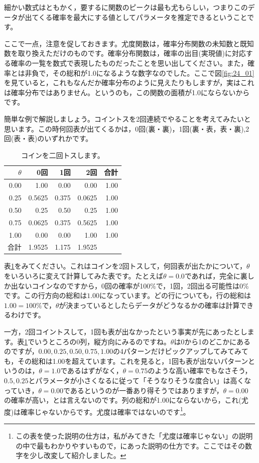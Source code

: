 \documentclass{ltjsbook}
\begin{document}
細かい数式はともかく，要するに関数のピークは最も尤もらしい，つまりこのデータが出てくる確率を最大にする値としてパラメータを推定できるということです。

ここで一点，注意を促しておきます。尤度関数は，確率分布関数の未知数と既知数を取り換えただけのものです。確率分布関数は，確率の出目(実現値)に対応する確率の一覧を数式で表現したものだったことを思い出してください。また，確率とは非負で，その総和が1.0になるような数字なのでした。ここで図\ref{fig:24_01}を見ていると，これもなんだか確率分布のように見えたりもしますが，実はこれは確率分布ではありません。というのも，この関数の面積が1.0にならないからです。

簡単な例で解説しましょう。コイントスを2回連続でやることを考えてみたいと思います。この時何回表が出てくるかは，0回(裏・裏)，1回(裏・表，表・裏),2回(表・表)のいずれかです。

\begin{table}[ht]
	\centering
	\caption{コインを二回トスします。}
	\begin{tabular}{rrrrr}
		\hline
		$\theta$ & 0回     & 1回    & 2回     & 合計   \\
		\hline
		0.00     & 1.00   & 0.00  & 0.00   & 1.00 \\
		0.25     & 0.5625 & 0.375 & 0.0625 & 1.00 \\
		0.50     & 0.25   & 0.50  & 0.25   & 1.00 \\
		0.75     & 0.0625 & 0.375 & 0.5625 & 1.00 \\
		1.00     & 0.00   & 0.00  & 1.00   & 1.00 \\
		\hline
		合計       & 1.9525 & 1.175 & 1.9525 &      \\
		\hline
	\end{tabular}
	\label{tbl::24_01}
\end{table}

表\ref{tbl::24_01}をみてください。これはコインを2回トスして，何回表が出たかについて，$\theta$をいろいろに変えて計算してみた表です。たとえば$\theta=0.0$であれば，完全に裏しか出ないコインなのですから，0回の確率が100\%で，1回，2回出る可能性は0\%です。この行方向の総和は$1.00$になっています。どの行についても，行の総和は$1.00=100\%$で，$\theta$が決まっているとしたらデータがどうなるかの確率は計算できるわけです。

一方，2回コイントスして，1回も表が出なかったという事実が先にあったとします。表\ref{tbl::24_01}でいうところの0列，縦方向にみるのですね。$\theta$は0から1のどこかにあるのですが，$0.00,0.25,0.50,0.75,1.00$の4パターンだけピックアップしてみてみても，その総和は1.00を超えています。これを見ると，1回も表が出ないパターンというのは，$\theta=1.0$であるはずがなく，$\theta=0.75$のような高い確率でもなさそう，$0.5,0.25$とパラメータが小さくなるに従って「そうなりそうな度合い」は高くなっていき，$\theta=0.00$であるというのが一番あり得そうではありますが，$\theta=0.00$の確率が高い，とは言えないのです。列の総和が1.00にならないから，これ(尤度)は確率じゃないからです。尤度は確率ではないのです\footnote{この表を使った説明の仕方は，私がみてきた「尤度は確率じゃない」の説明の中で最もわかりやすいもので，\textcite{Lambert201805}にあった説明の仕方です。ここではその数字を少し改変して紹介しました。}。
\end{document}
